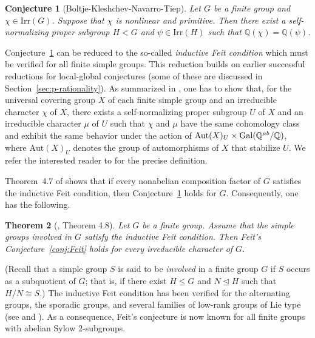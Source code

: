\documentclass[12pt]{amsart}
\newtheorem{theorem}{Theorem}[section]
\newtheorem{conjecture}[theorem]{Conjecture}
\theoremstyle{definition}
\numberwithin{equation}{section}
\newcommand{\Aut}{{\mathrm {Aut}}}
\newcommand{\Irr}{{\mathrm {Irr}}}
\newcommand{\Gal}{{\rm Gal}}
\newcommand{\QQ}{{\mathbb Q}}
\begin{document}
\begin{conjecture}[Boltje-Kleshchev-Navarro-Tiep]\label{conj:BKNT24}
Let $G$ be a finite group and $\chi\in\Irr(G)$. Suppose that $\chi$
is nonlinear and primitive. Then there exist a self-normalizing
proper subgroup $H< G$ and $\psi\in\Irr(H)$ such that $\QQ(\chi)=
\QQ(\psi)$.
\end{conjecture}

Conjecture~\ref{conj:BKNT24} can be reduced to the so-called
\emph{inductive Feit condition} which must be verified for all
finite simple groups. This reduction builds on earlier successful
reductions for local-global conjectures (some of these are discussed
in Section~\ref{sec:p-rationality}). As summarized in
\cite[\S1]{BKNT24}, one has to show that, for the universal covering
group $X$ of each finite simple group and an irreducible character
$\chi$ of $X$, there exists a self-normalizing proper subgroup $U$
of $X$ and an irreducible character $\mu$ of $U$ such that $\chi$
and $\mu$ have the same cohomology class and exhibit the same
behavior under the action of $\Aut(X)_U \times \Gal(\QQ^{ab}/\QQ)$,
where $\Aut(X)_U$ denotes the group of automorphisms of $X$ that
stabilize $U$. We refer the interested reader to \cite[\S3]{BKNT24}
for the precise definition.

Theorem~4.7 of \cite{BKNT24} shows that if every nonabelian
composition factor of $G$ satisfies the inductive Feit condition,
then Conjecture~\ref{conj:BKNT24} holds for $G$. Consequently, one
has the following.

\begin{theorem}[\cite{BKNT24}, Theorem 4.8]
Let $G$ be a finite group. Assume that the simple groups involved in
$G$ satisfy the inductive Feit condition. Then Feit's
Conjecture~\ref{conj:Feit} holds for every irreducible character of
$G$.
\end{theorem}

\noindent (Recall that a simple group \(S\) is said to be
\emph{involved} in a finite group \(G\) if \(S\) occurs as a
subquotient of \(G\); that is, if there exist \(H \le G\) and \(N
\trianglelefteq H\) such that $H/N \cong S$.) The inductive Feit
condition has been verified for the alternating groups, the sporadic
groups, and several families of low-rank groups of Lie type (see
\cite[\S5 \& \S8]{BKNT24} and \cite{Tapp25}). As a consequence,
Feit's conjecture is now known for all finite groups with abelian
Sylow $2$-subgroups.
\end{document}

